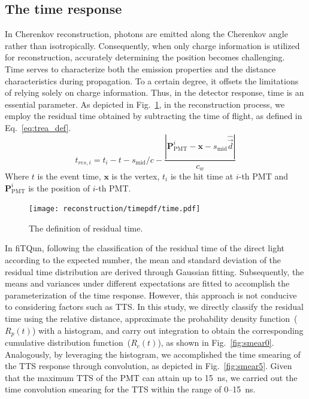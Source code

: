\subsection{The time response}
In Cherenkov reconstruction, photons are emitted along the Cherenkov angle rather than isotropically. Consequently, when only charge information is utilized for reconstruction, accurately determining the position becomes challenging. Time serves to characterize both the emission properties and the distance characteristics during propagation. To a certain degree, it offsets the limitations of relying solely on charge information. Thus, in the detector response, time is an essential parameter. As depicted in Fig.~\ref{fig:tres_define}, in the reconstruction process, we employ the residual time obtained by subtracting the time of flight, as defined in Eq.~\eqref{eq:trea_def}.
\begin{equation}
	t_{res,i} = t_i - t - s_{\mathrm{mid}}/c - \frac{|\boldsymbol{P}_{\mathrm{PMT}}^i - \boldsymbol{x} - s_{\mathrm{mid}}\widehat{\overrightarrow{d} } |}{c_w}
	\label{eq:trea_def}
\end{equation}
Where $t$ is the event time, $\boldsymbol{x}$ is the vertex, $t_i$ is the hit time at $i$-th PMT and $\boldsymbol{P}_{\mathrm{PMT}}^i$ is the position of $i$-th PMT.
\begin{figure}
	\begin{center}
		\texttt{[image: reconstruction/timepdf/time.pdf]}
	\end{center}
	\caption{The definition of residual time.}
	\label{fig:tres_define}
\end{figure}
In fiTQun, following the classification of the residual time of the direct light according to the expected number, the mean and standard deviation of the residual time distribution are derived through Gaussian fitting. Subsequently, the means and variances under different expectations are fitted to accomplish the parameterization of the time response. However, this approach is not conducive to considering factors such as TTS. In this study, we directly classify the residual time using the relative distance, approximate the probability density function~($R_p(t)$) with a histogram, and carry out integration to obtain the corresponding cumulative distribution function~($R_c(t)$), as shown in Fig.~\ref{fig:smear0}. Analogously, by leveraging the histogram, we accomplished the time smearing of the TTS response through convolution, as depicted in Fig.~\ref{fig:smear5}. Given that the maximum TTS of the PMT can attain up to \SI{15}{ns}, we carried out the time convolution smearing for the TTS within the range of 0--\SI{15}{ns}.

